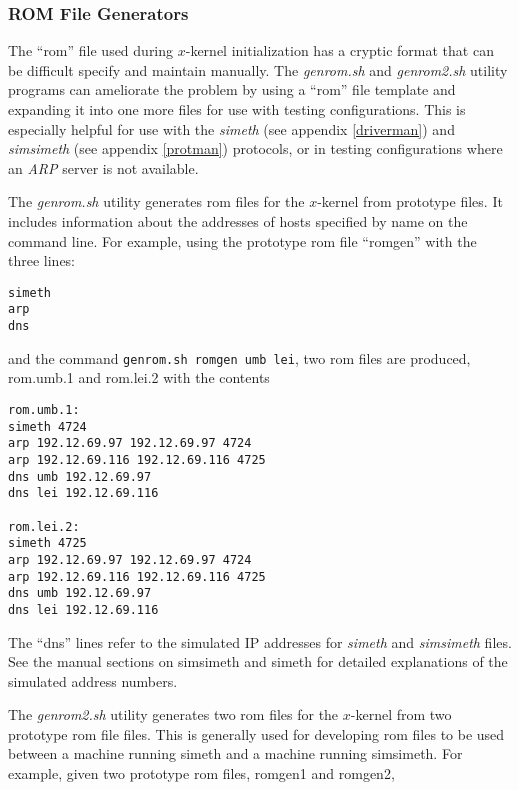 % 
%
%
%
%
%


\subsubsection{ROM File Generators}
\label{romgen}

The ``rom'' file used during $x$-kernel initialization has a cryptic
format that can be difficult specify and maintain manually.  The
{\em genrom.sh} and {\em genrom2.sh} utility programs can ameliorate
the problem by using a ``rom'' file template and expanding it into
one more files for use with testing configurations.  This is especially
helpful for use with the {\em simeth} (see appendix \ref{driverman})
and {\em simsimeth}
(see appendix \ref{protman}) protocols, or in testing configurations where an
{\em ARP} server is not available.


The {\em genrom.sh} utility generates rom files for the $x$-kernel from
prototype files.  It includes information about the addresses of hosts
specified by name on the command line.  For example, using the
prototype rom file ``romgen'' with the three lines:

\begin{verbatim}
simeth
arp
dns
\end{verbatim}

\noindent
and the command {\tt genrom.sh romgen umb lei}, two rom files are produced,
rom.umb.1 and rom.lei.2 with the contents

\begin{verbatim}
rom.umb.1:
simeth 4724
arp 192.12.69.97 192.12.69.97 4724
arp 192.12.69.116 192.12.69.116 4725
dns umb 192.12.69.97
dns lei 192.12.69.116

rom.lei.2:
simeth 4725
arp 192.12.69.97 192.12.69.97 4724
arp 192.12.69.116 192.12.69.116 4725
dns umb 192.12.69.97
dns lei 192.12.69.116
\end{verbatim}

The ``dns'' lines refer to the simulated IP addresses for {\em simeth} and
{\em simsimeth} files.  See the manual sections on simsimeth
and simeth for detailed explanations of the simulated address numbers.

The {\em genrom2.sh} utility generates two rom files for the $x$-kernel
from two prototype rom file files.  This is generally used for
developing rom files to be used between a machine running simeth and a
machine running simsimeth.  For example, given two prototype rom
files, romgen1 and romgen2,

